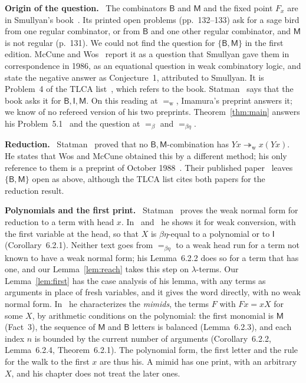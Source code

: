 \documentclass[a4paper,english]{lipics-v2021}
\newcommand{\B}{\mathsf{B}}
\newcommand{\M}{\mathsf{M}}
\newcommand{\I}{\mathsf{I}}
\newcommand{\wreds}{\twoheadrightarrow_{\mathrm{w}}}
\newcommand{\eqw}{=_{\mathrm{w}}}
\newcommand{\eqb}{=_{\beta}}
\newcommand{\eqbe}{=_{\beta\eta}}
\newcommand{\runin}[1]{\par\smallskip\noindent\textbf{#1}\ }
\begin{document}
\runin{Origin of the question.} The combinators $\B$ and $\M$ and the fixed point $F_x$ are in Smullyan's book~\cite{smullyan}. Its printed open problems (pp.~132--133) ask for a sage bird from one regular combinator, or from $\B$ and one other regular combinator, and $\M$ is not regular (p.~131). We could not find the question for $\{\B,\M\}$ in the first edition. McCune and Wos~\cite{mccunewos} report it as a question that Smullyan gave them in correspondence in 1986, as an equational question in weak combinatory logic, and state the negative answer as Conjecture~1, attributed to Smullyan. It is Problem~4 of the TLCA list~\cite{tlca}, which refers to the book. Statman~\cite{statman2011,statman2017} says that the book asks it for $\B,\I,\M$. On this reading at $\eqw$, Imamura's preprint answers it; we know of no refereed version of his two preprints. Theorem~\ref{thm:main} answers his Problem~5.1~\cite{imamura1} and the question at $\eqb$ and $\eqbe$.

\runin{Reduction.} Statman~\cite{statman1993} proved that no $\B,\M$-combination has $Yx \wreds x(Yx)$. He states that Wos and McCune obtained this by a different method; his only reference to them is a preprint of October 1988~\cite{wosmccune88}. Their published paper~\cite{mccunewos} leaves $\{\B,\M\}$ open as above, although the TLCA list cites both papers for the reduction result.

\runin{Polynomials and the first print.} Statman~\cite[Lemma~1]{statman1993} proves the weak normal form for reduction to a term with head $x$. In~\cite[Lemma~0.1]{statman2011} and~\cite[Lemma~6.2.1]{statman2017} he shows it for weak conversion, with the first variable at the head, so that $X$ is $\beta\eta$-equal to a polynomial or to $\I$ (Corollary~6.2.1). Neither text goes from $\eqbe$ to a weak head run for a term not known to have a weak normal form; his Lemma~6.2.2 does so for a term that has one, and our Lemma~\ref{lem:reach} takes this step on $\lambda$-terms. Our Lemma~\ref{lem:first} has the case analysis of his lemma, with any terms as arguments in place of fresh variables, and it gives the word directly, with no weak normal form. In~\cite{statman2017} he characterizes the \emph{mimids}, the terms $F$ with $Fx = xX$ for some $X$, by arithmetic conditions on the polynomial: the first monomial is $\M$ (Fact~3), the sequence of $\M$ and $\B$ letters is balanced (Lemma~6.2.3), and each index $n$ is bounded by the current number of arguments (Corollary~6.2.2, Lemma~6.2.4, Theorem~6.2.1). The polynomial form, the first letter and the rule for the walk to the first $x$ are thus his. A mimid has one print, with an arbitrary $X$, and his chapter does not treat the later ones.
\end{document}
